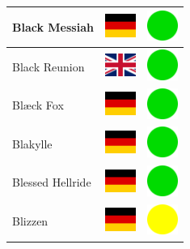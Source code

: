 \documentclass[12pt, a4paper, twoside]{report}
\begin{document}
\begin{center}
\begin{longtable}{|p{5cm}|p{2cm}|p{2cm}|}
 Black Messiah                                              & \includegraphics[width=1cm]{../img/flags/de} &   \includegraphics[width=1cm]{../likes/y} \\ \hline
 Black Reunion                                              & \includegraphics[width=1cm]{../img/flags/gb} &   \includegraphics[width=1cm]{../likes/y} \\ \hline
 Blæck Fox                                                  & \includegraphics[width=1cm]{../img/flags/de} &   \includegraphics[width=1cm]{../likes/y} \\ \hline
 Blakylle                                                   & \includegraphics[width=1cm]{../img/flags/de} &   \includegraphics[width=1cm]{../likes/y} \\ \hline
 Blessed Hellride                                           & \includegraphics[width=1cm]{../img/flags/de} &   \includegraphics[width=1cm]{../likes/y} \\ \hline
 Blizzen                                                    & \includegraphics[width=1cm]{../img/flags/de} &   \includegraphics[width=1cm]{../likes/m} \\ \hline

\end{longtable}
\end{center}
\end{document}
